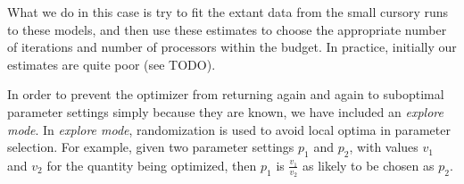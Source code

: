 What we do in this case is try to fit the extant data from the small
cursory runs to these models, and then use these estimates to choose
the appropriate number of iterations and number of processors within the
budget. In practice, initially our estimates are quite poor (see TODO).

In order to prevent the optimizer from returning again and again to
suboptimal parameter settings simply because they are known, we have 
included an {\em explore mode}. In {\em explore mode}, randomization is
used to avoid local optima in parameter selection. For example, given two
parameter settings $p_1$ and $p_2$, with values $v_1$  and $v_2$ for the
quantity being optimized, then $p_1$ is $\frac{v_1}{v_2}$ as likely to
be chosen as $p_2$. 


